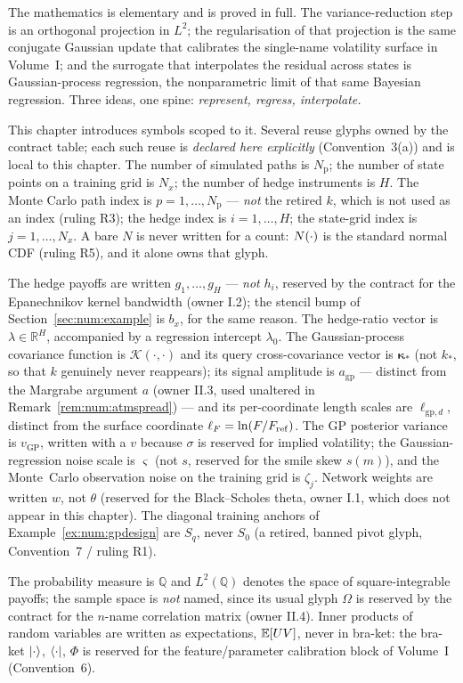 The mathematics is elementary and is proved in full. The variance-reduction
step is an orthogonal projection in $L^2$; the regularisation of that projection
is the same conjugate Gaussian update that calibrates the single-name volatility
surface in Volume~I; and the surrogate that interpolates the residual across
states is Gaussian-process regression, the nonparametric limit of that same
Bayesian regression. Three ideas, one spine: \emph{represent, regress,
interpolate.}

\begin{remark}\label{rem:num:notation}
This chapter introduces symbols scoped to it. Several reuse glyphs owned by the
contract table; each such reuse is \emph{declared here explicitly}
(Convention~3(a)) and is local to this chapter. The number of simulated paths is
$N_{\mathrm{p}}$; the number of state points on a training grid is $N_{x}$; the
number of hedge instruments is $H$. The Monte Carlo path index is
$p = 1,\dots,N_{\mathrm{p}}$ --- \emph{not} the retired $k$, which is not used as an
index (ruling R3); the hedge index is $i = 1,\dots,H$; the state-grid index is
$j = 1,\dots,N_{x}$. A bare $N$ is never written for a count: $N(\cdot)$ is the
standard normal CDF (ruling R5), and it alone owns that glyph.

The hedge payoffs are written $g_1,\dots,g_H$ --- \emph{not} $h_i$, reserved by
the contract for the Epanechnikov kernel bandwidth (owner I.2); the stencil bump
of Section~\ref{sec:num:example} is $b_x$, for the same reason. The hedge-ratio
vector is $\lambda \in \mathbb{R}^H$, accompanied by a regression intercept
$\lambda_0$. The Gaussian-process covariance function is $\mathcal{K}(\cdot,\cdot)$
and its query cross-covariance vector is $\boldsymbol{\kappa}_\ast$ (not $k_\ast$,
so that $k$ genuinely never reappears); its signal amplitude is $a_{\mathrm{gp}}$
--- distinct from the Margrabe argument $a$ (owner II.3, used unaltered in
Remark~\ref{rem:num:atmspread}) --- and its per-coordinate length scales are
$\ell_{\mathrm{gp},d}$, distinct from the surface coordinate $\ell_F = \ln(F/F_{\mathrm{ref}})$.
The GP posterior variance is $v_{\mathrm{GP}}$, written with a $v$ because
$\sigma$ is reserved for implied volatility; the Gaussian-regression noise scale
is $\varsigma$ (not $s$, reserved for the smile skew $s(m)$), and the Monte~Carlo
observation noise on the training grid is $\zeta_j$. Network weights are written
$w$, not $\theta$ (reserved for the Black--Scholes theta, owner I.1, which does
not appear in this chapter). The diagonal training anchors of
Example~\ref{ex:num:gpdesign} are $S_q$, never $S_0$ (a retired, banned pivot
glyph, Convention~7 / ruling R1).

The probability measure is $\mathbb{Q}$ and $L^2(\mathbb{Q})$ denotes the
space of square-integrable payoffs; the sample space is \emph{not} named, since
its usual glyph $\Omega$ is reserved by the contract for the $n$-name
correlation matrix (owner II.4). Inner products of random variables are written as expectations,
$\mathbb{E}[UV]$, never in bra-ket: the bra-ket $\mathinner{\lvert \cdot \rangle}$, $\mathinner{\langle \cdot \rvert}$, $\Phi$ is
reserved for the feature/parameter calibration block of Volume~I (Convention~6).
\end{remark}

